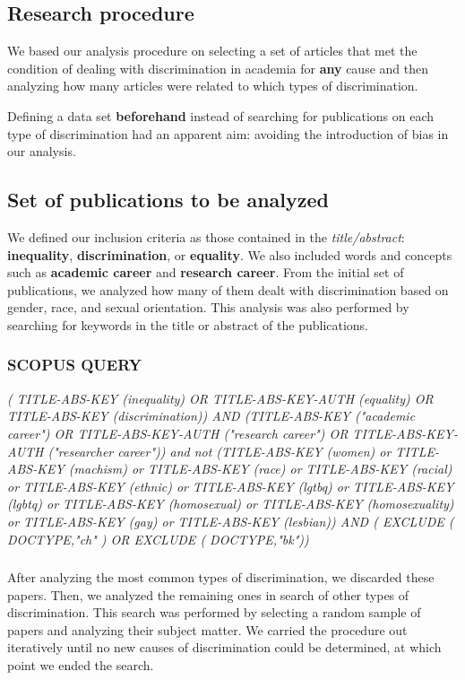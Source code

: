 \documentclass[runningheads]{llncs}
\begin{document}
\subsection{Research procedure}
We based our analysis procedure on selecting a set of articles that met the condition of dealing with discrimination in academia for \textbf{any} cause and then analyzing how many articles were related to which types of discrimination. 

Defining a data set \textbf{beforehand} instead of searching for publications on each type of discrimination had an apparent aim: avoiding the introduction of bias in our analysis.

\subsection{Set of publications to be analyzed} 
We defined our inclusion criteria as those contained in the \textit{title/abstract}: \textbf{inequality}, \textbf{discrimination}, or \textbf{equality}. We also included words and concepts such as \textbf{academic career} and \textbf{research career}. From the initial set of publications, we analyzed how many of them dealt with discrimination based on gender, race, and sexual orientation. This analysis was also performed by searching for keywords in the title or abstract of the publications. 

\subsubsection{SCOPUS QUERY}
\textit{( TITLE-ABS-KEY (inequality) OR TITLE-ABS-KEY-AUTH (equality) OR TITLE-ABS-KEY (discrimination)) AND (TITLE-ABS-KEY ("academic career") OR TITLE-ABS-KEY-AUTH ("research career") OR TITLE-ABS-KEY-AUTH ("researcher career")) and not (TITLE-ABS-KEY (women) or TITLE-ABS-KEY (machism) or TITLE-ABS-KEY (race) or TITLE-ABS-KEY (racial) or TITLE-ABS-KEY (ethnic) or TITLE-ABS-KEY (lgtbq) or TITLE-ABS-KEY (lgbtq) or TITLE-ABS-KEY (homosexual) or TITLE-ABS-KEY (homosexuality) or TITLE-ABS-KEY (gay) or TITLE-ABS-KEY (lesbian)) AND ( EXCLUDE ( DOCTYPE,"ch" ) OR EXCLUDE ( DOCTYPE,"bk"))}

\subsubsection{}
After analyzing the most common types of discrimination, we discarded these papers. Then, we analyzed the remaining ones in search of other types of discrimination. This search was performed by selecting a random sample of papers and analyzing their subject matter. We carried the procedure out iteratively until no new causes of discrimination could be determined, at which point we ended the search. 
\end{document}
